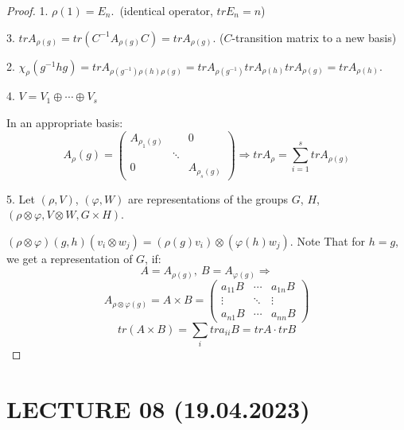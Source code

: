 \documentclass[12pt, a4paper]{article}
\theoremstyle{definition}
\begin{document}
\begin{proof}
    \par
    1. $\rho(1) = E_n$.\ (identical operator, $tr E_n = n$)
    \par
    3. $trA_{\rho(g)} = tr(C^{-1}A_{\rho(g)}C) = trA_{\rho(g)}$. ($C$-transition matrix to a
    new basis)
    \par
    2. $\chi_\rho (g^{-1}hg) = tr A_{\rho(g^{-1})\rho(h)\rho(g)} = trA_{\rho(g^{-1})} 
    trA_{\rho(h)} trA_{\rho(g)} = trA_{\rho(h)}$.
    \par
    4. $V= V_1\oplus \cdots \oplus V_s$
    \par
    In an appropriate basis:
    \[A_\rho(g) = 
    \begin{pmatrix}
        A_{\rho_1(g)}   &       &   0               \\
                        &\ddots &                   \\
        0               &       &   A_{\rho_s(g)}
    \end{pmatrix}
    \Rightarrow trA_{\rho} = \sum_{i=1}^{s} trA_{\rho(g)}
    \]
    \par
    5. Let $(\rho, V)$, $(\varphi, W)$ are representations of the groups $G$, $H$, 
    $(\rho \otimes \varphi, V \otimes W, G \times H)$.
    \par
    $(\rho \otimes \varphi)(g,h)(v_i\otimes w_j) = (\rho(g)v_i)\otimes (\varphi(h)w_j)$.
    Note That for $h = g$, we get a representation of $G$, if:
    \[A = A_{\rho(g)},\ B = A_{\varphi(g)} \Rightarrow\]
    \[A_{\rho \otimes \varphi (g)} = A \times B = 
    \begin{pmatrix}
            a_{11}B & \cdots & a_{1n}B  \\
            \vdots  & \ddots & \vdots   \\
            a_{n1}B & \cdots & a_{nn}B 
    \end{pmatrix}
    \]
    \[tr(A\times B) = \sum_i tr a_{ii}B = trA \cdot trB\]
\end{proof}

\newpage
\section{LECTURE 08 (19.04.2023)}
\end{document}
